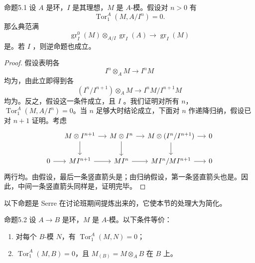 \begin{SGAresult}{命题}{5.1}
设 $A$ 是环，$I$ 是其理想，$M$ 是 $A$-模。假设对 $n>0$ 有
\[
\operatorname{Tor}_1^A(M,A/I^n)=0.
\]
那么典范满
\[
\operatorname{gr}_I^0(M)\otimes_{A/I}\operatorname{gr}_I(A)
\longrightarrow\operatorname{gr}_I(M)\tag{$*$}
\]
是。若 $I$ ，则逆命题也成立。
\end{SGAresult}
\begin{proof}
假设表明各
\[
I^n\otimes_A M\longrightarrow I^nM
\]
均为，由此立即得到各
\[
(I^n/I^{n+1})\otimes_A M\longrightarrow I^nM/I^{n+1}M
\]
均为。反之，假设这一条件成立，且 $I$ 。我们证明对所有 $n$，$\operatorname{Tor}_1^A(M,A/I^n)=0$。当 $n$ 足够大时结论成立，下面对 $n$ 作递降归纳，假设已对 $n+1$ 证明。考虑
\[
\begin{tikzcd}[column sep=small]
{} & M\otimes I^{n+1}\arrow[r]\arrow[d] & M\otimes I^n\arrow[r]\arrow[d] & M\otimes(I^n/I^{n+1})\arrow[r]\arrow[d] & 0\\
0\arrow[r] & MI^{n+1}\arrow[r] & MI^n\arrow[r] & MI^n/MI^{n+1}\arrow[r] & 0
\end{tikzcd}
\]
两行均。由假设，最后一条竖直箭头是；由归纳假设，第一条竖直箭头也是。因此，中间一条竖直箭头同样是，证明完毕。
\end{proof}

以下命题是 Serre 在讨论班期间提炼出来的，它使本节的处理大为简化。
\begin{SGAresult}{命题}{5.2}
设 $A\to B$ 是环，$M$ 是 $A$-模。以下条件等价：
\begin{enumerate}
\item[(i)] 对每个 $B$-模 $N$，有 $\operatorname{Tor}_1^A(M,N)=0$；
\item[(ii)] $\operatorname{Tor}_1^A(M,B)=0$，且 $M_{(B)}=M\otimes_A B$ 在 $B$ 上。
\end{enumerate}
\end{SGAresult}

